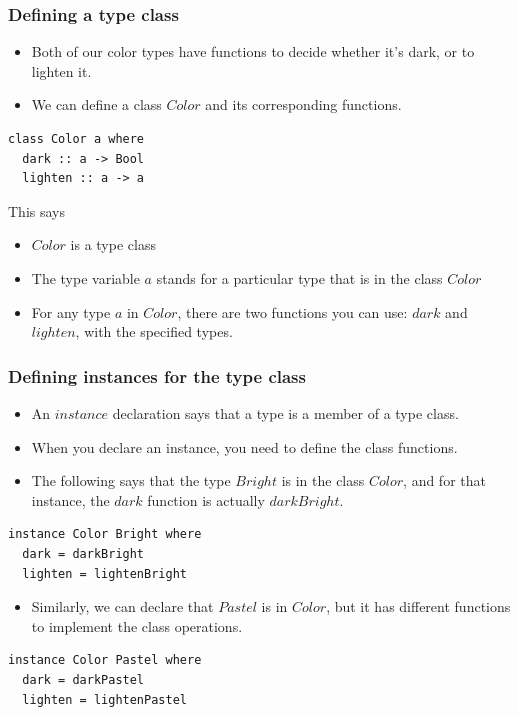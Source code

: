 \documentclass{beamer}
\begin{document}
\begin{frame}[fragile]
\frametitle{Defining a type class}

\begin{itemize}
\item Both of our color types have functions to decide whether it's
  dark, or to lighten it.
\item We can define a class $Color$ and its corresponding
  functions.
\end{itemize}

\begin{verbatim}
class Color a where
  dark :: a -> Bool
  lighten :: a -> a
\end{verbatim}

This says
\begin{itemize}
\item $Color$ is a type class
\item The type variable $a$ stands for a particular type that is in
  the class $Color$
\item For any type $a$ in $Color$, there are two functions you can
  use: $dark$ and $lighten$, with the specified types.
\end{itemize}

\end{frame}

\begin{frame}[fragile]
\frametitle{Defining instances for the type class}

\begin{itemize}
\item An $instance$ declaration says that a type is a member of a
  type class.
\item When you declare an instance, you need to define the class
  functions.
\item The following says that the type $Bright$ is in the class
  $Color$, and for that instance, the $dark$ function is actually
  $darkBright$.
\end{itemize}

\begin{verbatim}
instance Color Bright where
  dark = darkBright
  lighten = lightenBright
\end{verbatim}

\begin{itemize}
\item Similarly, we can declare that $Pastel$ is in $Color$, but it
  has different functions to implement the class operations.
\end{itemize}

\begin{verbatim}
instance Color Pastel where
  dark = darkPastel
  lighten = lightenPastel
\end{verbatim}

\end{frame}
\end{document}
